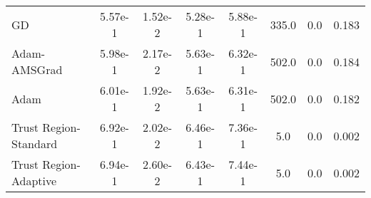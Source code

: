 \documentclass{article}
\begin{document}
\begin{table}[htbp]
{\begin{tabular}{l*{7}{S[table-format=2.2e-1]}}
GD & 5.57e-1 & 1.52e-2 & 5.28e-1 & 5.88e-1 & 335.0 & 0.0 & 0.183 \\
Adam-AMSGrad & 5.98e-1 & 2.17e-2 & 5.63e-1 & 6.32e-1 & 502.0 & 0.0 & 0.184 \\
Adam & 6.01e-1 & 1.92e-2 & 5.63e-1 & 6.31e-1 & 502.0 & 0.0 & 0.182 \\
Trust Region-Standard & 6.92e-1 & 2.02e-2 & 6.46e-1 & 7.36e-1 & 5.0 & 0.0 & 0.002 \\
Trust Region-Adaptive & 6.94e-1 & 2.60e-2 & 6.43e-1 & 7.44e-1 & 5.0 & 0.0 & 0.002 \\
\bottomrule
\end{tabular}
}
\end{table}
\end{document}
